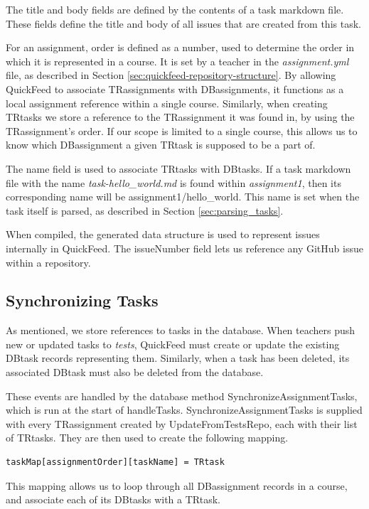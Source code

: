 

The title and body fields are defined by the contents of a task markdown file.
These fields define the title and body of all issues that are created from this task.

For an assignment, order is defined as a number, used to determine the order in which it is represented in a course.
It is set by a teacher in the \textit{assignment.yml} file, as described in Section \ref{sec:quickfeed-repository-structure}.
By allowing QuickFeed to associate TRassignments with DBassignments, it functions as a local assignment reference within a single course.
Similarly, when creating TRtasks we store a reference to the TRassignment it was found in, by using the TRassignment's order.
If our scope is limited to a single course, this allows us to know which DBassignment a given TRtask is supposed to be a part of.

The name field is used to associate TRtasks with DBtasks.
If a task markdown file with the name \textit{task-hello\_world.md} is found within \textit{assignment1}, then its corresponding name will be assignment1/hello\_world.
This name is set when the task itself is parsed, as described in Section \ref{sec:parsing_tasks}.

\pagebreak


When compiled, the generated data structure is used to represent issues internally in QuickFeed.
The issueNumber field lets us reference any GitHub issue within a repository.

\subsection{Synchronizing Tasks}

As mentioned, we store references to tasks in the database.
When teachers push new or updated tasks to \textit{tests}, QuickFeed must create or update the existing DBtask records representing them.
Similarly, when a task has been deleted, its associated DBtask must also be deleted from the database.

These events are handled by the database method SynchronizeAssignmentTasks, which is run at the start of handleTasks.
SynchronizeAssignmentTasks is supplied with every TRassignment created by UpdateFromTestsRepo, each with their list of TRtasks.
They are then used to create the following mapping.
\begin{lstlisting}[caption={Task mapping}, language=Golang, label={code:task-mapping}, numbers=none, basicstyle=\ttfamily\footnotesize]
taskMap[assignmentOrder][taskName] = TRtask
\end{lstlisting}
This mapping allows us to loop through all DBassignment records in a course, and associate each of its DBtasks with a TRtask.

